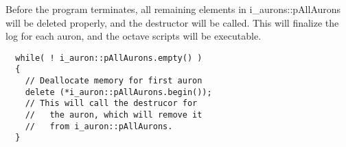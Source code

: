 Before the program terminates, all remaining elements in i\_aurons::pAllAurons will be deleted properly, and the destructor will be called.
This will finalize the log for each auron, and the octave scripts will be executable.

\begin{lstlisting}
  while( ! i_auron::pAllAurons.empty() ) 
  { 
    // Deallocate memory for first auron
    delete (*i_auron::pAllAurons.begin()); 
    // This will call the destrucor for
    //   the auron, which will remove it
    //   from i_auron::pAllAurons.
  }   
\end{lstlisting}




